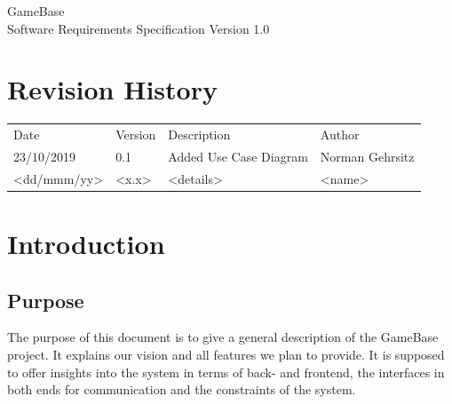 \documentclass[a4paper,12pt,chapterprefix=false,bibliography=totoc,listof=totoc,]{scrreprt}
\begin{document}
\begin{flushright}
GameBase
\\
Software Requirements Specification
\bigbreak
Version 1.0
\end{flushright}
\chapter*{Revision History}
\begin{table}[H]
	\centering
	\everyrow{\hline}
	\begin{tabu} to \textwidth {|X[c]|X[c]|X[c]|X[c]|}
		Date & Version & Description & Author\\
		23/10/2019 & 0.1 & Added Use Case Diagram & Norman Gehrsitz\\
		<dd/mmm/yy> & <x.x> & <details> & <name>\\
	\end{tabu}
	\label{tab:rev-hist}
\end{table}

\tableofcontents

\chapter{Introduction}



\section{Purpose}
The purpose of this document is to give a general description of the GameBase project. It explains our vision and all features we plan to provide. It is supposed to offer insights into the system in terms of back- and frontend, the interfaces in both ends for communication and the constraints of the system.
\end{document}
